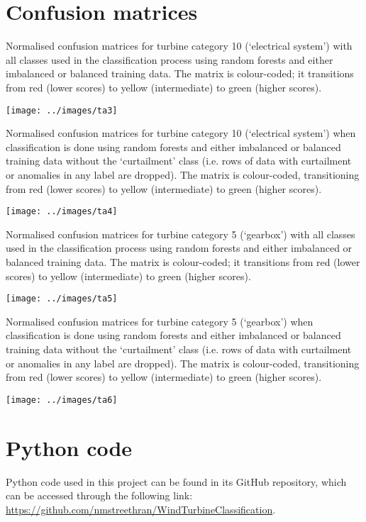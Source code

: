 \chapter{Confusion matrices}\label{a4}

\begin{table}
  \centering
  \captionsetup{labelformat=empty,list=no}
  \caption{Normalised confusion matrices for turbine category 10 (`electrical
  system') with all classes used in the classification process using random
  forests and either imbalanced or balanced training data. The matrix is
  colour-coded; it transitions from red (lower scores) to yellow
  (intermediate) to green (higher scores).}
  \texttt{[image: ../images/ta3]}
\end{table}

\begin{table}
  \centering
  \captionsetup{labelformat=empty,list=no}
  \caption{Normalised confusion matrices for turbine category 10 (`electrical
  system') when classification is done using random forests and either
  imbalanced or balanced training data without the `curtailment' class (i.e.
  rows of data with curtailment or anomalies in any label are dropped). The
  matrix is colour-coded, transitioning from red (lower scores) to yellow
  (intermediate) to green (higher scores).}
  \texttt{[image: ../images/ta4]}
\end{table}

\begin{table}
  \centering
  \captionsetup{labelformat=empty,list=no}
  \caption{Normalised confusion matrices for turbine category 5 (`gearbox')
  with all classes used in the classification process using random forests and
  either imbalanced or balanced training data. The matrix is colour-coded; it
  transitions from red (lower scores) to yellow (intermediate) to green
  (higher scores).}
  \texttt{[image: ../images/ta5]}
\end{table}

\begin{table}
  \centering
  \captionsetup{labelformat=empty,list=no}
  \caption{Normalised confusion matrices for turbine category 5 (`gearbox')
  when classification is done using random forests and either imbalanced or
  balanced training data without the `curtailment' class (i.e. rows of data
  with curtailment or anomalies in any label are dropped). The matrix is
  colour-coded, transitioning from red (lower scores) to yellow (intermediate)
  to green (higher scores).}
  \texttt{[image: ../images/ta6]}
\end{table}

\chapter{Python code}\label{a5}

Python code used in this project can be found in its GitHub repository, which
can be accessed through the following link:
\url{https://github.com/nmstreethran/WindTurbineClassification}.
